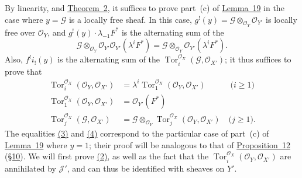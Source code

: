 \documentclass{article}
\theoremstyle{plain}
\theoremstyle{definition}
\newcommand{\scr}[1]{{\mathscr{#1}}}
\renewcommand{\geq}{\geqslant}
\DeclareMathOperator{\Tor}{Tor}
\newcommand{\oldpage}[1]{\marginpar{\footnotesize$\Big\vert$ \textit{p.~#1}}}
\begin{document}
By linearity, and \hyperref[theorem2]{Theorem~2}, it suffices to prove part~(c) of \hyperref[lemma19]{Lemma~19} in the case where $y=\scr{G}$ is a locally free sheaf.
In this case, $g^!(y)=\scr{G}\otimes_{\scr{O}_Y}\scr{O}_{Y'}$ is locally free over $\scr{O}_Y$, and $g^!(y)\cdot\lambda_{-1}F^*$ is the alternating sum of the
\[
  \scr{G} \otimes_{\scr{O}_Y} \scr{O}_{Y'} \scr{O}_{Y'}(\lambda^i F^*)
  = \scr{G} \otimes_{\scr{O}_Y} \scr{O}_{Y'}(\lambda^i F^*).
\]
Also, $f^!i_!(y)$ is the alternating sum of the $\Tor_i^{\scr{O}_X}(\scr{G},\scr{O}_{X'})$;
it thus suffices to prove that
\begin{align*}
  \label{section15equation2}
    \Tor_i^{\scr{O}_X}(\scr{O}_Y,\scr{O}_{X'}) &= \lambda^i\Tor_1^{\scr{O}_X}(\scr{O}_Y,\scr{O}_{X'})
    \qquad\quad\mbox{($i\geq1$)}
    \tag{2}
\\
  \label{section15equation3}
    \Tor_1^{\scr{O}_X}(\scr{O}_Y,\scr{O}_{X'}) &= \scr{O}_{Y'}(F^*)
    \tag{3}
\\
  \label{section15equation4}
    \Tor_j^{\scr{O}_X}(\scr{G},\scr{O}_{X'}) &= \scr{G}\otimes_{\scr{O}_Y}\Tor_j^{\scr{O}_X}(\scr{O}_Y,\scr{O}_{X'})
    \quad\mbox{($j\geq1$).}
    \tag{4}
\end{align*}
\oldpage{131}
The equalities \hyperref[section15equation3]{(3)} and \hyperref[section15equation4]{(4)} correspond to the particular case of part~(c) of \hyperref[lemma19]{Lemma~19} where $y=1$;
their proof will be analogous to that of \hyperref[proposition12]{Proposition~12} (\hyperref[section10]{\S10}).
We will first prove \hyperref[section15equation2]{(2)}, as well as the fact that the $\Tor_i^{\scr{O}_X}(\scr{O}_Y,\scr{O}_{X'})$ are annihilated by $\scr{J}'$, and can thus be identified with sheaves on $Y'$.
\end{document}
